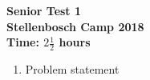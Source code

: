 \documentclass{article}
\begin{document}
\begin{center}
\textbf{\Large Senior Test 1}
\\ \vspace{1em}
\textbf{\large Stellenbosch Camp 2018}
\\ \vspace{1em}
\textbf{\large Time: $2\frac{1}{2}$ hours}
\end{center}

\begin{enumerate}[1.]

\item %
Problem statement

\end{enumerate}
\end{document}
